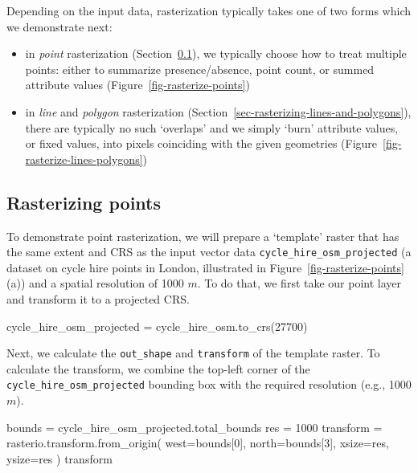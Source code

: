 \documentclass[
  letterpaper,
]{krantz}
\newenvironment{Shaded}{\begin{snugshade}}{\end{snugshade}}
\newcommand{\DecValTok}[1]{\textcolor[rgb]{0.68,0.00,0.00}{#1}}
\newcommand{\NormalTok}[1]{\textcolor[rgb]{0.00,0.23,0.31}{#1}}
\newcommand{\OperatorTok}[1]{\textcolor[rgb]{0.37,0.37,0.37}{#1}}
\providecommand{\tightlist}{%
  \setlength{\itemsep}{0pt}\setlength{\parskip}{0pt}}\usepackage{longtable,booktabs,array}
\begin{document}
Depending on the input data, rasterization typically takes one of two
forms which we demonstrate next:

\begin{itemize}
\tightlist
\item
  in \emph{point} rasterization (Section~\ref{sec-rasterizing-points}),
  we typically choose how to treat multiple points: either to summarize
  presence/absence, point count, or summed attribute values
  (Figure~\ref{fig-rasterize-points})
\item
  in \emph{line} and \emph{polygon} rasterization
  (Section~\ref{sec-rasterizing-lines-and-polygons}), there are
  typically no such `overlaps' and we simply `burn' attribute values, or
  fixed values, into pixels coinciding with the given geometries
  (Figure~\ref{fig-rasterize-lines-polygons})
\end{itemize}

\subsection{Rasterizing points}\label{sec-rasterizing-points}

To demonstrate point rasterization, we will prepare a `template' raster
that has the same extent and CRS as the input vector data
\texttt{cycle\_hire\_osm\_projected} (a dataset on cycle hire points in
London, illustrated in Figure~\ref{fig-rasterize-points} (a)) and a
spatial resolution of 1000 \(m\). To do that, we first take our point
layer and transform it to a projected CRS.

\begin{Shaded}
\begin{Highlighting}[]
\NormalTok{cycle\_hire\_osm\_projected }\OperatorTok{=}\NormalTok{ cycle\_hire\_osm.to\_crs(}\DecValTok{27700}\NormalTok{)}
\end{Highlighting}
\end{Shaded}

Next, we calculate the \texttt{out\_shape} and \texttt{transform} of the
template raster. To calculate the transform, we combine the top-left
corner of the \texttt{cycle\_hire\_osm\_projected} bounding box with the
required resolution (e.g., 1000 \(m\)).

\begin{Shaded}
\begin{Highlighting}[]
\NormalTok{bounds }\OperatorTok{=}\NormalTok{ cycle\_hire\_osm\_projected.total\_bounds}
\NormalTok{res }\OperatorTok{=} \DecValTok{1000}
\NormalTok{transform }\OperatorTok{=}\NormalTok{ rasterio.transform.from\_origin(}
\NormalTok{    west}\OperatorTok{=}\NormalTok{bounds[}\DecValTok{0}\NormalTok{], }
\NormalTok{    north}\OperatorTok{=}\NormalTok{bounds[}\DecValTok{3}\NormalTok{], }
\NormalTok{    xsize}\OperatorTok{=}\NormalTok{res, }
\NormalTok{    ysize}\OperatorTok{=}\NormalTok{res}
\NormalTok{)}
\NormalTok{transform}
\end{Highlighting}
\end{Shaded}
\end{document}
